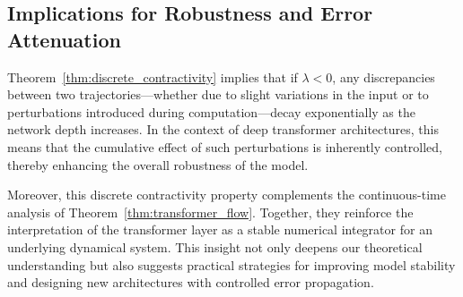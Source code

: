 \subsection{Implications for Robustness and Error Attenuation}

Theorem~\ref{thm:discrete_contractivity} implies that if $\lambda < 0$, any discrepancies between two trajectories---whether due to slight variations in the input or to perturbations introduced during computation---decay exponentially as the network depth increases. In the context of deep transformer architectures, this means that the cumulative effect of such perturbations is inherently controlled, thereby enhancing the overall robustness of the model.

Moreover, this discrete contractivity property complements the continuous-time analysis of Theorem~\ref{thm:transformer_flow}. Together, they reinforce the interpretation of the transformer layer as a stable numerical integrator for an underlying dynamical system. This insight not only deepens our theoretical understanding but also suggests practical strategies for improving model stability and designing new architectures with controlled error propagation.
